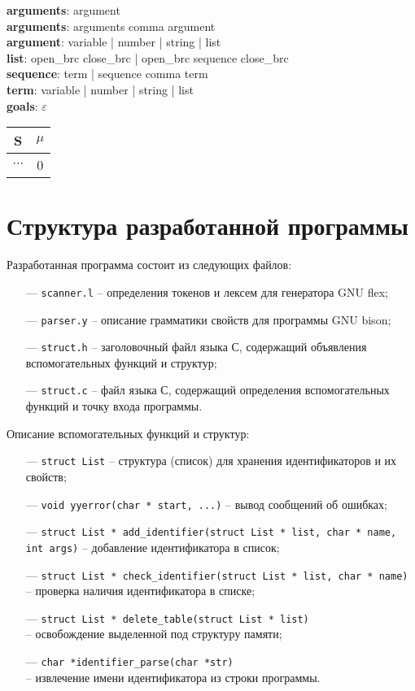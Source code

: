 \documentclass[a4paper,12pt]{article}
\newcommand{\psection}[1]{\newpage\section{#1}}
\begin{document}
    \noindent
    {\bf arguments}: argument\\
    {\bf arguments}: arguments comma argument\\
    {\bf argument}: variable | number | string | list\\
    {\bf list}: open\_brc close\_brc | open\_brc sequence close\_brc\\
    {\bf sequence}: term | sequence comma term\\
    {\bf term}: variable | number | string | list\\
    {\bf goals}: $\varepsilon$ \\
     \begin{tabular}{c | c}
        S & $\mu$ \\
        \hline
        $\cdots$ & 0 \\
    \end{tabular}    
 
    \psection{Структура разработанной программы}
    \noindent
    Разработанная программа состоит из следующих файлов:
    \begin{itemize}[leftmargin=*] \itemsep1pt
        \item[---] \verb|scanner.l| -- определения токенов и лексем для генератора GNU flex;
        \item[---] \verb|parser.y| -- описание грамматики свойств для программы GNU bison;
        \item[---] \verb|struct.h| -- заголовочный файл языка С, содержащий объявления вспомогательных функций и структур;
        \item[---] \verb|struct.c| -- файл языка С, содержащий определения вспомогательных функций и точку входа программы. 
    \end{itemize}
    Описание вспомогательных функций и структур:
    \begin{itemize}[leftmargin=*] \itemsep1pt
        \item[---] \verb|struct List| -- структура (список) для хранения идентификаторов и их свойств;
        \item[---] \verb|void yyerror(char * start, ...)| -- вывод сообщений об ошибках;
        \item[---] \verb|struct List * add_identifier(struct List * list, char * name, int args)| -- добавление идентификатора в список;
        \item[---] \verb|struct List * check_identifier(struct List * list, char * name)|\\-- проверка наличия идентификатора в списке;
        \item[---] \verb|struct List * delete_table(struct List * list)|\\-- освобождение выделенной под структуру памяти; 
        \item[---] \verb|char *identifier_parse(char *str)|\\-- извлечение имени идентификатора из строки программы.
    \end{itemize}
\end{document}
